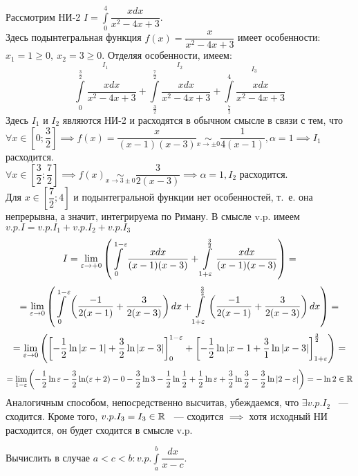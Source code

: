 \documentclass[../../main.tex]{subfiles}
\begin{document}
\begin{exmp}
Рассмотрим НИ-2 $ I = \int\limits_0^4 \dfrac{xdx}{x^2 - 4x + 3} $.\\
Здесь подынтегральная функция $ f(x) = \dfrac{x}{x^2 - 4x + 3} $ имеет
особенности: $ x_1 = 1 \geq 0,\ x_2 = 3 \geq 0 $.
Отделяя особенности, имеем:
\[
\stackrel{I_1}{\int\limits_0^{\frac{3}{2}} \dfrac{xdx}{x^2 - 4x + 3}} +
\stackrel{I_2}{\int\limits_\frac{3}{2}^\frac{7}{2}\dfrac{xdx}{x^2 - 4x + 3}} +
\stackrel{I_3}{\int\limits_\frac{7}{2}^4\dfrac{xdx}{x^2 - 4x + 3}}
\] 
Здесь $ I_1 \text{ и } I_2 $ являются НИ-2 и расходятся в обычном смысле
в связи с тем, что $ \forall x \in \left[0; \dfrac{3}{2}\right] \implies
f(x) = \dfrac{x}{(x - 1)(x - 3)} \underset{x \to \pm 0}{\sim}
\dfrac{1}{4(x - 1)}, \alpha = 1 \implies I_1$ расходится.\\
$ \forall x \in \left[\dfrac{3}{2}; \dfrac{7}{2}\right] \implies 
f(x) \underset{x \to 3 \pm 0}{\sim} \dfrac{3}{2(x - 3)} \implies \alpha = 1,
I_2$ расходится.\\
Для $ x \in \left[\dfrac{7}{2}; 4\right] $ и подынтегральной функции нет
особенностей, т.~е. она непрерывна, а значит, интегрируема по Риману.
В смысле v.p. имеем
$ v.p. I = v.p. I_1 + v.p. I_2 + v.p. I_3 $
\[
I = \lim\limits_{\varepsilon \to +0} \left(
\int\limits_0^{1 - \varepsilon} \dfrac{xdx}{(x-1)(x-3)} +
\int\limits_{1 + \varepsilon}^\frac{3}{2} \dfrac{xdx}{(x-1)(x-3)}
\right) = \]
\[ =
\lim\limits_{\varepsilon \to 0} \left(
\int\limits_0^{1 - \varepsilon} \left(
\dfrac{-1}{2(x - 1)} + \dfrac{3}{2(x - 3)}
\right) dx + \int\limits_{1 + \varepsilon}^\frac{3}{2} \left(
\dfrac{-1}{2(x - 1)} + \dfrac{3}{2(x - 3)}
\right) dx
\right) =
\]
\[ =
\lim\limits_{\varepsilon \to 0} \left(
\left[
-\dfrac{1}{2} \ln{|x - 1|} + \dfrac{3}{2} \ln{|x - 3|} 
\right]_0^{1 - \varepsilon} +
\left[
-\dfrac{1}{2} \ln{|x - 1} + \dfrac{3}{1} \ln{|x - 3|}
\right]_{1 + \varepsilon}^\frac{3}{2}
\right) =
\]
\[ =
\lim\limits_{1 - \varepsilon} \left(
-\dfrac{1}{2}\ln\varepsilon - \dfrac{3}{2}\ln(\varepsilon + 2) - 0 - \dfrac{3}{2}\ln3 -
\dfrac{1}{2}\ln\dfrac{1}{2} + \dfrac{1}{2}\ln\varepsilon + 
\dfrac{3}{2}\ln\dfrac{3}{2}-
\dfrac{3}{2}\ln|2 - \varepsilon|
\right) = -\ln 2 \in \mathbb{R}
\]
Аналогичным способом, непосредственно высчитав, убеждаемся, что $ \exists v.p.
I_2$ ~--- сходится. Кроме того, $ v.p. I_3 = I_3 \in \mathbb{R} $ ~--- сходится $ 
\implies $ хотя исходный НИ расходится, он будет сходится в смысле v.p.
\end{exmp}
\begin{exercise}
	Вычислить в случае $ a < c < b : v.p. \int\limits_a^b \dfrac{dx}{x - c} $.
\end{exercise}
\end{document}
